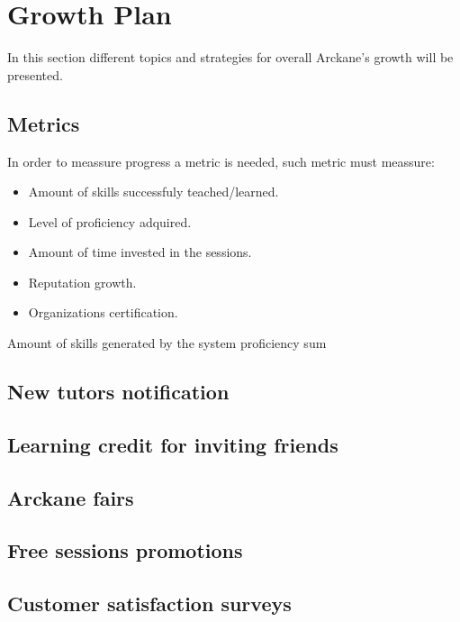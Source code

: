 \section{Growth Plan}\label{growthplan}

In this section different topics and strategies for overall Arckane's growth will be presented. 

\subsection{Metrics}

In order to meassure progress a metric is needed, such metric must meassure:

\begin{itemize}
\item Amount of skills successfuly teached/learned.
\item Level of proficiency adquired.
\item Amount of time invested in the sessions.
\item Reputation growth.
\item Organizations certification.
\end{itemize}

Amount of skills generated by the system proficiency sum

\subsection{New tutors notification}

\subsection{Learning credit for inviting friends}

\subsection{Arckane fairs}

\subsection{Free sessions promotions}

\subsection{Customer satisfaction surveys}
